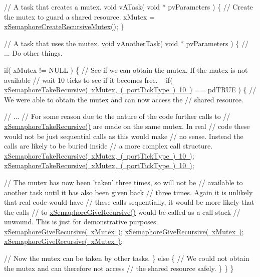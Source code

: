 \begin{DoxyPre}// A task that creates a mutex.
void vATask( void * pvParameters )
\{
   // Create the mutex to guard a shared resource.
   xMutex = \mbox{\hyperlink{semphr_8h_a1bbc843be5a41ea83d2693b2189fc0f8}{xSemaphoreCreateRecursiveMutex()}};
\}\end{DoxyPre}



\begin{DoxyPre}// A task that uses the mutex.
void vAnotherTask( void * pvParameters )
\{
   // ... Do other things.\end{DoxyPre}



\begin{DoxyPre}   if( xMutex != NULL )
   \{
       // See if we can obtain the mutex.  If the mutex is not available
       // wait 10 ticks to see if it becomes free.  
~\newline
       if( \mbox{\hyperlink{semphr_8h_ad395f4bba51eea6af3397d72bc079e4d}{xSemaphoreTakeRecursive( xMutex, ( portTickType ) 10 )}} == pdTRUE )
       \{
           // We were able to obtain the mutex and can now access the
           // shared resource.\end{DoxyPre}



\begin{DoxyPre}           // ...
           // For some reason due to the nature of the code further calls to 
        // \mbox{\hyperlink{semphr_8h_ad395f4bba51eea6af3397d72bc079e4d}{xSemaphoreTakeRecursive()}} are made on the same mutex.  In real
        // code these would not be just sequential calls as this would make
        // no sense.  Instead the calls are likely to be buried inside
        // a more complex call structure.
           \mbox{\hyperlink{semphr_8h_ad395f4bba51eea6af3397d72bc079e4d}{xSemaphoreTakeRecursive( xMutex, ( portTickType ) 10 )}};
           \mbox{\hyperlink{semphr_8h_ad395f4bba51eea6af3397d72bc079e4d}{xSemaphoreTakeRecursive( xMutex, ( portTickType ) 10 )}};\end{DoxyPre}



\begin{DoxyPre}           // The mutex has now been 'taken' three times, so will not be 
        // available to another task until it has also been given back
        // three times.  Again it is unlikely that real code would have
        // these calls sequentially, it would be more likely that the calls
        // to \mbox{\hyperlink{semphr_8h_a398d66b17856c22dd49d39aaac42f105}{xSemaphoreGiveRecursive()}} would be called as a call stack
        // unwound.  This is just for demonstrative purposes.
           \mbox{\hyperlink{semphr_8h_a398d66b17856c22dd49d39aaac42f105}{xSemaphoreGiveRecursive( xMutex )}};
        \mbox{\hyperlink{semphr_8h_a398d66b17856c22dd49d39aaac42f105}{xSemaphoreGiveRecursive( xMutex )}};
        \mbox{\hyperlink{semphr_8h_a398d66b17856c22dd49d39aaac42f105}{xSemaphoreGiveRecursive( xMutex )}};\end{DoxyPre}



\begin{DoxyPre}        // Now the mutex can be taken by other tasks.
       \}
       else
       \{
           // We could not obtain the mutex and can therefore not access
           // the shared resource safely.
       \}
   \}
\}
\end{DoxyPre}
 